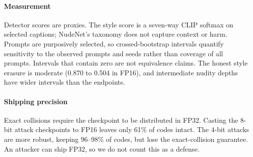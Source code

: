\paragraph{Measurement}
Detector scores are proxies. The style score is a seven-way CLIP softmax on selected
captions; NudeNet's taxonomy does not capture context or harm. Prompts are purposively
selected, so crossed-bootstrap intervals quantify sensitivity to the observed prompts
and seeds rather than coverage of all prompts. Intervals that contain zero are not
equivalence claims. The honest style erasure is moderate (0.870 to 0.504 in FP16), and
intermediate nudity depths have wider intervals than the endpoints.

\paragraph{Shipping precision}
Exact collisions require the checkpoint to be distributed in FP32. Casting the 8-bit
attack checkpoints to FP16 leaves only 61\% of codes intact. The 4-bit attacks are
more robust, keeping 96--98\% of codes, but lose the exact-collision guarantee. An attacker can ship FP32, so we do not count this as a defense.

